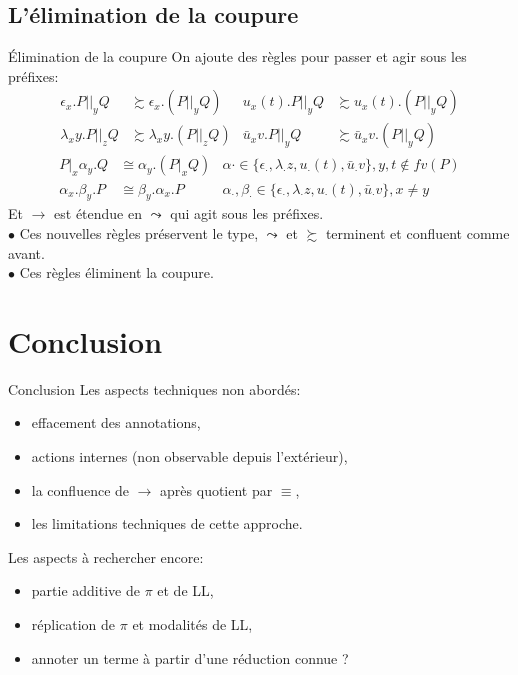 \documentclass[11pt]{beamer}
\begin{document}
\subsection{L'élimination de la coupure}

\begin{frame}{Élimination de la coupure}
On ajoute des règles pour passer et agir sous les préfixes:
\begin{align*}
\epsilon_x.P||_yQ &\succsim \epsilon_x.(P||_yQ) & u_x(t).P||_yQ &\succsim u_x(t).(P||_yQ)\\
\lambda_xy.P||_zQ &\succsim \lambda_xy.(P||_zQ) & \bar{u}_xv.P||_yQ &\succsim \bar{u}_xv.(P||_yQ)
\end{align*}
\begin{align*}
P|_x \alpha_y.Q &\cong \alpha_y.(P|_xQ) & \alpha\cdot \in \{\epsilon_\cdot,\lambda_\cdot z,u_\cdot(t),\bar{u}_\cdot v\}, y,t\not\in fv(P)\\
\alpha_x.\beta_y.P &\cong \beta_y.\alpha_x.P & \alpha_\cdot,\beta_\cdot \in \{\epsilon_\cdot,\lambda_\cdot z,u_\cdot(t),\bar{u}_\cdot v\},x\neq y
\end{align*}
Et $\to$ est étendue en $\leadsto$ qui agit sous les préfixes.\\
\pause$\bullet$ Ces nouvelles règles préservent le type, $\leadsto$ et $\succsim$ terminent et confluent comme avant.\\
\pause$\bullet$ Ces règles éliminent la coupure.
\end{frame}

\section{Conclusion}

\begin{frame}{Conclusion}
Les aspects techniques non abordés:
\begin{itemize}
\item effacement des annotations,
\item actions internes (non observable depuis l'extérieur),
\item la confluence de $\to$ après quotient par $\equiv$,
\item les limitations techniques de cette approche.
\end{itemize}
Les aspects à rechercher encore:
\begin{itemize}
\item partie additive de $\pi$ et de LL,
\item réplication de $\pi$ et modalités de LL,
\item annoter un terme à partir d'une réduction connue ?
\end{itemize}
\end{frame}
\end{document}
